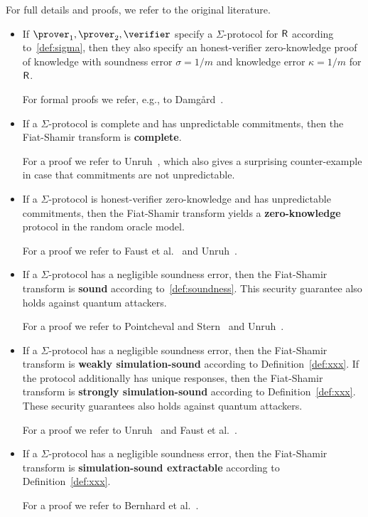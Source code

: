 \documentclass[runningheads]{llncs}
\begin{document}
For full details and proofs, we refer to the original literature.
\begin{itemize}
  \item
    If $\prover_1,\prover_2,\verifier$ specify a $\Sigma$-protocol for $\mathsf{R}$ according to~\cref{def:sigma}, then they also specify an honest-verifier zero-knowledge proof of knowledge with soundness error $\sigma=1/m$ and knowledge error $\kappa=1/m$ for $\mathsf{R}$.

For formal proofs we refer, e.g., to Damg\r{a}rd~\cite{damgard04}.
  \item
    If a $\Sigma$-protocol is complete and has unpredictable commitments, then the Fiat-Shamir transform is {\bf complete}.

    For a proof we refer to Unruh~\cite{AC:Unruh17}, which also gives a surprising counter-example in case that commitments are not unpredictable.
  \item
    If a $\Sigma$-protocol is honest-verifier zero-knowledge and has unpredictable commitments, then the Fiat-Shamir transform yields a {\bf zero-knowledge} protocol in the random oracle model.

    For a proof we refer to Faust et al.~\cite{INDOCRYPT:FKMV12} and Unruh~\cite{AC:Unruh17}.
  \item
    If a $\Sigma$-protocol has a negligible soundness error, then the Fiat-Shamir transform is {\bf sound} according to~\cref{def:soundness}.
    This security guarantee also holds against quantum attackers.

    For a proof we refer to Pointcheval and Stern~\cite{JC:PoiSte00} and Unruh~\cite{AC:Unruh17}.
  \item
    If a $\Sigma$-protocol has a negligible soundness error, then the Fiat-Shamir transform is {\bf weakly simulation-sound} according to Definition~\ref{def:xxx}.
    If the protocol additionally has unique responses, then the Fiat-Shamir transform is {\bf strongly simulation-sound} according to Definition~\ref{def:xxx}.
    These security guarantees also holds against quantum attackers.

    For a proof we refer to Unruh~\cite{AC:Unruh17} and Faust et al.~\cite{INDOCRYPT:FKMV12}.
  \item
    If a $\Sigma$-protocol has a negligible soundness error, then the Fiat-Shamir transform is {\bf simulation-sound extractable} according to Definition~\ref{def:xxx}.

    For a proof we refer to Bernhard et al.~\cite{AC:BerPerWar12}.
\end{itemize}
\end{document}
